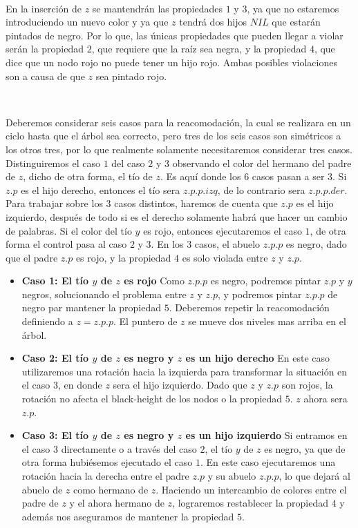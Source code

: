 ~

En la inserci\'on de $z$ se mantendr\'an las propiedades $1$ y $3$, ya que no estaremos introduciendo un nuevo color y ya que $z$ tendr\'a dos hijos $NIL$ que estar\'an pintados de negro. Por lo que, las \'unicas propiedades que pueden llegar a violar ser\'an la propiedad $2$, que requiere que la ra\'iz sea negra, y la propiedad $4$, que dice que un nodo rojo no puede tener un hijo rojo. Ambas posibles violaciones son a causa de que $z$ sea pintado rojo.

~

Deberemos considerar seis casos para la reacomodaci\'on, la cual se realizara en un ciclo hasta que el \'arbol sea correcto, pero tres de los seis casos son sim\'etricos a los otros tres, por lo que realmente solamente necesitaremos considerar tres casos. Distinguiremos el caso $1$ del caso $2$ y $3$ observando el color del hermano del padre de $z$, dicho de otra forma, el t\'io de $z$. Es aqu\'i donde los $6$ casos pasan a ser $3$. Si $z.p$ es el hijo derecho, entonces el t\'io sera $z.p.p.izq$, de lo contrario sera $z.p.p.der$. Para trabajar sobre los $3$ casos distintos, haremos de cuenta que $z.p$ es el hijo izquierdo, despu\'es de todo si es el derecho solamente habr\'a que hacer un cambio de palabras. Si el color del t\'io $y$ es rojo, entonces ejecutaremos el caso $1$, de otra forma el control pasa al caso $2$ y $3$. En los $3$ casos, el abuelo $z.p.p$ es negro, dado que el padre $z.p$ es rojo, y la propiedad $4$ es solo violada entre $z$ y $z.p$.

\begin{itemize}
 \item \textbf{Caso 1: El t\'io $y$ de $z$ es rojo} Como $z.p.p$ es negro, podremos pintar $z.p$ y $y$ negros, solucionando el problema entre $z$ y $z.p$, y podremos pintar $z.p.p$ de negro par mantener la propiedad $5$. Deberemos repetir la reacomodaci\'on definiendo a $z = z.p.p$. El puntero de $z$ se mueve dos niveles mas arriba en el \'arbol.
 \item \textbf{Caso 2: El t\'io $y$ de $z$ es negro y $z$ es un hijo derecho} En este caso utilizaremos una rotaci\'on hacia la izquierda para transformar la situaci\'on en el caso $3$, en donde $z$ sera el hijo izquierdo. Dado que $z$ y $z.p$ son rojos, la rotaci\'on no afecta el black-height de los nodos o la propiedad $5$. $z$ ahora sera $z.p$.
 \item \textbf{Caso 3: El t\'io $y$ de $z$ es negro y $z$ es un hijo izquierdo} Si entramos en el caso $3$ directamente o a trav\'es del caso $2$, el t\'io $y$ de $z$ es negro, ya que de otra forma hubi\'esemos ejecutado el caso $1$. En este caso ejecutaremos una rotaci\'on hacia la derecha entre el padre $z.p$ y su abuelo $z.p.p$, lo que dejar\'a al abuelo de $z$ como hermano de $z$. Haciendo un intercambio de colores entre el padre de $z$ y el ahora hermano de $z$, lograremos restablecer la propiedad $4$ y adem\'as nos aseguramos de mantener la propiedad $5$.
 \end{itemize}

